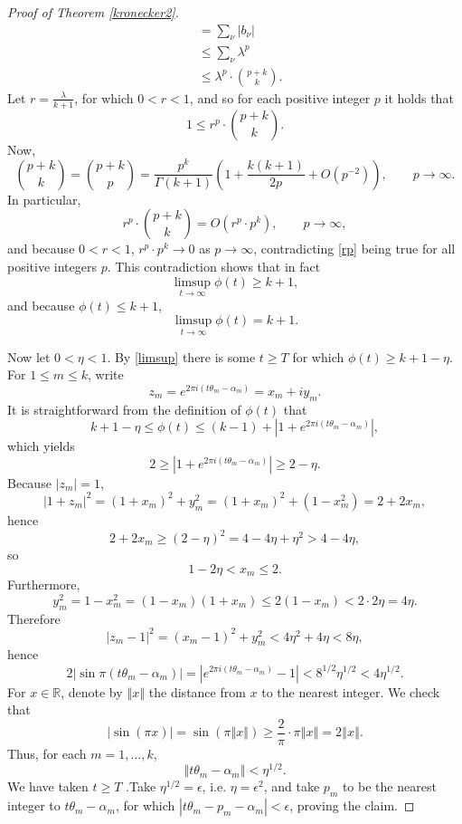 \documentclass{article}
\newcommand{\norm}[1]{\left\Vert #1 \right\Vert}
\theoremstyle{definition}
\begin{document}
\begin{proof}[Proof of Theorem \ref{kronecker2}]
\begin{align*}
&=\sum_\nu |b_\nu|\\
&\leq  \sum_\nu \lambda^p\\
&\leq \lambda^p \cdot \binom{p+k}{k}.
\end{align*}
Let $r = \frac{\lambda}{k+1}$, for which $0<r<1$, and so for each positive integer $p$ it holds that
\begin{equation}
1 \leq r^p \cdot \binom{p+k}{k}.
\label{rp}
\end{equation}
Now, 
\[
\binom{p+k}{k} = \binom{p+k}{p} = \frac{p^k}{\Gamma(k+1)}\left(1+\frac{k(k+1)}{2p} + O(p^{-2}) \right),
\qquad p \to \infty.
\]
In particular,
\[
r^p \cdot \binom{p+k}{k} = O(r^p \cdot p^k),\qquad p \to \infty,
\]
and because $0<r<1$, $r^p \cdot p^k \to 0$ as $p \to \infty$, contradicting \eqref{rp} being true for all
positive integers $p$. This contradiction shows that in fact
\[
\limsup_{t \to \infty} \phi(t) \geq k+1,
\]
and because $\phi(t) \leq k+1$, 
\begin{equation}
\limsup_{t \to \infty} \phi(t) = k+1.
\label{limsup}
\end{equation}

Now let $0<\eta<1$. By \eqref{limsup} there is some $t \geq T$ for which $\phi(t) \geq k+1-\eta$. 
For $1 \leq m \leq k$, write
\[
z_m=e^{2\pi i(t\theta_m-\alpha_m)} = x_m+iy_m.
\]
It is straightforward from the definition of $\phi(t)$ that 
\[
k+1-\eta \leq \phi(t) \leq (k-1) + |1+e^{2\pi i(t\theta_m-\alpha_m)}|,
\]
which yields
\[
2 \geq |1+e^{2\pi i(t\theta_m-\alpha_m)}| \geq 2-\eta.
\]
Because $|z_m|=1$,
\[
|1+z_m|^2=(1+x_m)^2+y_m^2
=(1+x_m)^2+(1-x_m^2)
=2+2x_m,
\]
hence
\[
2+2x_m \geq (2-\eta)^2 = 4-4\eta + \eta^2 > 4-4\eta,
\]
so
\[
1-2\eta < x_m \leq 2.
\]
Furthermore,
\[
y_m^2 = 1-x_m^2 = (1-x_m)(1+x_m) \leq 2(1-x_m) < 2\cdot 2\eta = 4\eta.
\]
Therefore
\[
|z_m-1|^2 = (x_m-1)^2 + y_m^2 < 4\eta^2 + 4\eta < 8\eta,
\]
hence
\[
2 |\sin \pi(t\theta_m-\alpha_m)|
=
|e^{2\pi i(t\theta_m-\alpha_m)}-1| < 8^{1/2} \eta^{1/2} < 4 \eta^{1/2}.
\]
For $x \in \mathbb{R}$, denote by $\norm{x}$ the distance from $x$ to the nearest integer. We check that
\[
|\sin (\pi x)| = \sin(\pi \norm{x}) \geq \frac{2}{\pi} \cdot \pi \norm{x} = 2\norm{x}. 
\]
Thus, for each $m=1,\ldots,k$,
\[
\norm{t\theta_m-\alpha_m} < \eta^{1/2}.
\]
We have taken $t \geq T$ .Take
 $\eta^{1/2} = \epsilon$, i.e. $\eta = \epsilon^2$, and take $p_m$ to be the nearest integer to $t\theta_m-\alpha_m$, for which
 $|t\theta_m - p_m - \alpha_m| < \epsilon$, proving the claim.
\end{proof}
\end{document}
